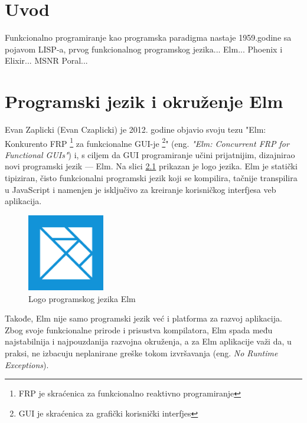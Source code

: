 \documentclass[12pt,oneside]{memoir}
\begin{document}
\frontmatter
\naslovna
\komisija
\apstrakt
\tableofcontents*

\mainmatter

\chapter{Uvod}

Funkcionalno programiranje kao programska paradigma nastaje 1959.godine sa
pojavom LISP-a, prvog funkcionalnog programskog jezika...
 Elm... Phoenix i Elixir... MSNR Poral...

\chapter{Programski jezik i okruženje Elm}
Evan Zaplicki (Evan Czaplicki) je 2012. godine objavio svoju tezu "Elm: Konkurento FRP
\footnote{FRP je skraćenica za funkcionalno reaktivno programiranje} za funkcionalne GUI-je
\footnote{GUI je skraćenica za grafički korisnički interfjes}" (eng. \emph{"Elm: Concurrent
FRP for Functional GUIs"}) \cite{elm:2012} i, s ciljem da GUI programiranje učini
prijatnijim, dizajnirao novi programski jezik --- Elm. Na slici \ref{fig:elm-logo} prikazan
je logo jezika.
Elm je statički tipiziran, čisto funkcionalni programski jezik koji se
kompilira, tačnije transpilira u JavaScript i namenjen je isključivo za
kreiranje korisničkog interfjesa veb aplikacija.
\begin{figure}[!ht]
  \centering
  \includegraphics[width=0.3\textwidth]{elm.png}
  \caption{Logo programskog jezika Elm}
  \label{fig:elm-logo}
\end{figure}
Takođe, Elm nije samo programski jezik već i platforma za razvoj aplikacija.
Zbog svoje funkcionalne prirode i prisustva kompilatora, Elm spada među
najstabilnija i najpouzdanija razvojna okruženja, a za Elm aplikacije važi
da, u praksi, ne izbacuju neplanirane greške tokom izvršavanja (eng. \emph{No 
Runtime Exceptions}).
\end{document}
